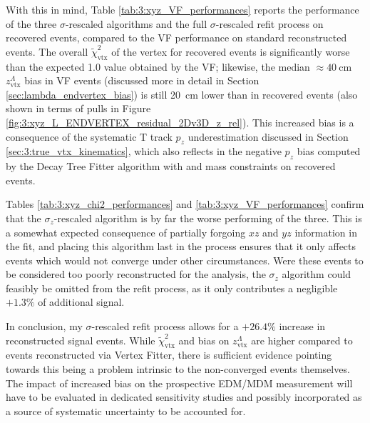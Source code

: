 With this in mind, Table \ref{tab:3:xyz_VF_performances} reports the performance of the three $\sigma$-rescaled algorithms and the full $\sigma$-rescaled refit process on recovered events, compared to the VF performance on standard reconstructed events.
The overall $\tilde{\chi}^2_\text{vtx}$ of the \lambdadecay vertex for recovered events is significantly worse than the expected 1.0 value obtained by the VF;
likewise, the median $\approx \SI{40}{\centi\meter}$ $z_\text{vtx}^\Lambda$ bias in VF events (discussed more in detail in Section \ref{sec:lambda_endvertex_bias}) is still \SI{20}{\centi\meter} lower than in recovered events (also shown in terms of pulls in Figure \ref{fig:3:xyz_L_ENDVERTEX_residual_2Dv3D_z_rel}).
This increased bias is a consequence of the systematic T track $p_z$ underestimation discussed in Section \ref{sec:3:true_vtx_kinematics}, which also reflects in the negative $p_z$ bias computed by the Decay Tree Fitter algorithm with \jpsi and \lz mass constraints on recovered events.

Tables \ref{tab:3:xyz_chi2_performances} and \ref{tab:3:xyz_VF_performances} confirm that the $\sigma_z$-rescaled algorithm is by far the worse performing of the three.
This is a somewhat expected consequence of partially forgoing $xz$ and $yz$ information in the fit, and placing this algorithm last in the process ensures that it only affects events which would not converge under other circumstances.
Were these events to be considered too poorly reconstructed for the \lz analysis, the $\sigma_z$ algorithm could feasibly be omitted from the refit process, as it only contributes a negligible $+1.3\%$ of additional signal.

In conclusion, my $\sigma$-rescaled refit process allows for a $+26.4\%$ increase in reconstructed signal events.
While $\tilde{\chi}^2_\text{vtx}$ and bias on $z_\text{vtx}^\Lambda$ are higher compared to events reconstructed via Vertex Fitter, there is sufficient evidence pointing towards this being a problem intrinsic to the non-converged events themselves.
The impact of increased bias on the prospective \lz EDM/MDM measurement will have to be evaluated in dedicated sensitivity studies and possibly incorporated as a source of systematic uncertainty to be accounted for.


